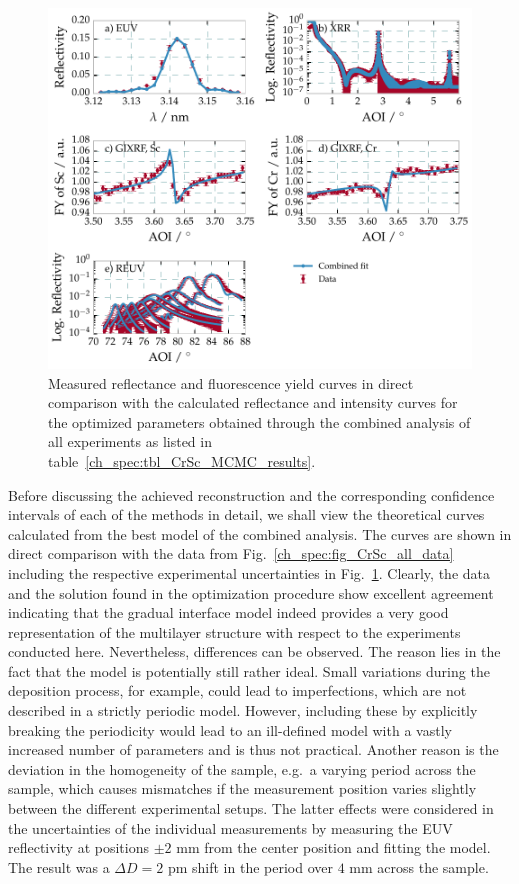 \begin{figure}[htbp]
  \centering
  \includegraphics[width=\textwidth]{img/CrSc_combined_fit_result}
  \caption{Measured reflectance and fluorescence yield curves in direct comparison with the calculated reflectance and intensity curves for the 
optimized parameters obtained through the combined analysis of all experiments as listed in 
table~\ref{ch_spec:tbl_CrSc_MCMC_results}.}
  \label{ch_spec:fig_combined_fit_result}
\end{figure}
Before discussing the achieved reconstruction and the corresponding confidence intervals of each of the methods in detail, we shall view the theoretical curves calculated from the best model of the combined analysis. The curves are shown in direct comparison with the data from Fig.~\ref{ch_spec:fig_CrSc_all_data} including the respective experimental uncertainties in Fig.~\ref{ch_spec:fig_combined_fit_result}. Clearly, the data and the solution found in the optimization procedure show excellent agreement indicating that the gradual interface model indeed provides a very good representation of the multilayer structure with respect to the experiments conducted here. Nevertheless, differences can be observed. The reason lies 
in the fact that the model is potentially still rather ideal. Small variations 
during the deposition process, for example, could lead to imperfections, which 
are not described in a strictly periodic model. However, including these by 
explicitly breaking the periodicity would lead to an ill-defined model 
with a vastly increased number of parameters and is thus not practical. Another 
reason is the deviation in the homogeneity of the sample, e.g.~a varying period 
across the sample, which causes mismatches if the measurement position varies 
slightly between the different experimental setups. The latter effects were 
considered in the uncertainties of the individual measurements by measuring the 
EUV reflectivity at positions $\pm 2$ mm from the center position and fitting 
the model. The result was a $\Delta D = 2$ pm shift in the period over $4$ mm 
across the sample.


